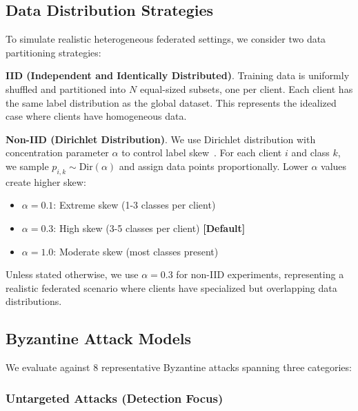 
\subsection{Data Distribution Strategies}
\label{sec:data_distribution}

To simulate realistic heterogeneous federated settings, we consider two data partitioning strategies:

\textbf{IID (Independent and Identically Distributed)}. Training data is uniformly shuffled and partitioned into $N$ equal-sized subsets, one per client. Each client has the same label distribution as the global dataset. This represents the idealized case where clients have homogeneous data.

\textbf{Non-IID (Dirichlet Distribution)}. We use Dirichlet distribution with concentration parameter $\alpha$ to control label skew~\cite{hsu2019measuring}. For each client $i$ and class $k$, we sample $p_{i,k} \sim \text{Dir}(\alpha)$ and assign data points proportionally. Lower $\alpha$ values create higher skew:
\begin{itemize}[leftmargin=*,noitemsep]
    \item $\alpha = 0.1$: Extreme skew (1-3 classes per client)
    \item $\alpha = 0.3$: High skew (3-5 classes per client) \textbf{[Default]}
    \item $\alpha = 1.0$: Moderate skew (most classes present)
\end{itemize}

Unless stated otherwise, we use $\alpha = 0.3$ for non-IID experiments, representing a realistic federated scenario where clients have specialized but overlapping data distributions.


\subsection{Byzantine Attack Models}
\label{sec:attacks}

We evaluate against 8 representative Byzantine attacks spanning three categories:

\subsubsection{Untargeted Attacks (Detection Focus)}

